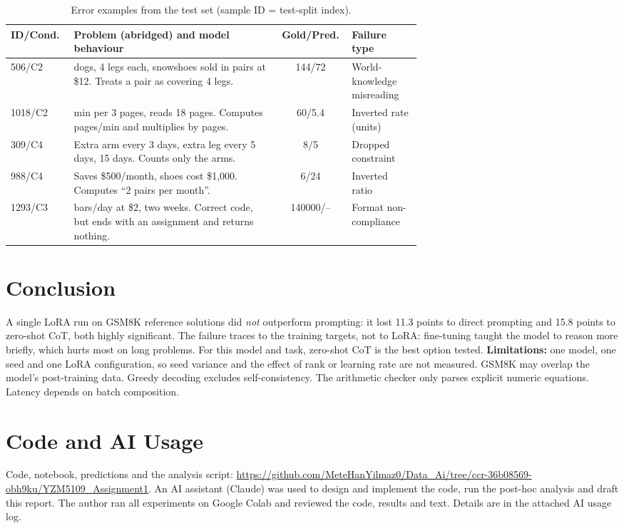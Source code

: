 \documentclass[conference]{IEEEtran}
\begin{document}
\begin{table}[t]\centering
\caption{Error examples from the test set (sample ID = test-split index).}\label{tab:errors}
\footnotesize\setlength{\tabcolsep}{2.5pt}
\begin{tabular}{@{}l>{\raggedright\arraybackslash}p{0.50\linewidth}c>{\raggedright\arraybackslash}p{0.17\linewidth}@{}}\toprule
ID/Cond. & Problem (abridged) and model behaviour & Gold/Pred. & Failure type \\\midrule
506/C2 & 6 dogs, 4 legs each, snowshoes sold in pairs at \$12. Treats a pair as covering 4 legs. & 144/72 & World-knowledge misreading \\
1018/C2 & 10 min per 3 pages, reads 18 pages. Computes pages/min and multiplies by pages. & 60/5.4 & Inverted rate (units) \\
309/C4 & Extra arm every 3 days, extra leg every 5 days, 15 days. Counts only the arms. & 8/5 & Dropped constraint \\
988/C4 & Saves \$500/month, shoes cost \$1{,}000. Computes ``2 pairs per month''. & 6/24 & Inverted ratio \\
1293/C3 & 5000 bars/day at \$2, two weeks. Correct code, but ends with an assignment and returns nothing. & 140000/-- & Format non-compliance \\\bottomrule
\end{tabular}\end{table}

\section{Conclusion}
A single LoRA run on GSM8K reference solutions did \emph{not} outperform prompting: it lost 11.3 points to
direct prompting and 15.8 points to zero-shot CoT, both highly significant. The failure traces to the
training targets, not to LoRA: fine-tuning taught the model to reason more briefly, which hurts most on long
problems. For this model and task, zero-shot CoT is the best option tested. \textbf{Limitations:} one model,
one seed and one LoRA configuration, so seed variance and the effect of rank or learning rate are not
measured. GSM8K may overlap the model's post-training data. Greedy decoding excludes self-consistency. The
arithmetic checker only parses explicit numeric equations. Latency depends on batch composition.

\section*{Code and AI Usage}
Code, notebook, predictions and the analysis script:
\url{https://github.com/MeteHanYilmaz0/Data_Ai/tree/ccr-36b08569-obh9ku/YZM5109_Assignment1}.
An AI assistant (Claude) was used to design and implement the code, run the post-hoc analysis and draft this
report. The author ran all experiments on Google Colab and reviewed the code, results and text. Details are in
the attached AI usage log.
\end{document}
